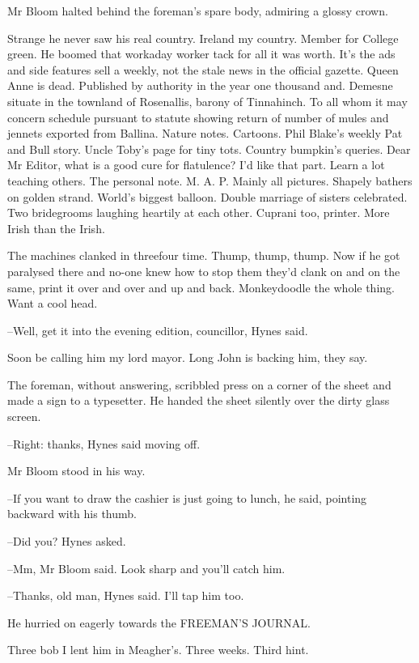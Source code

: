 Mr Bloom halted behind the foreman's spare body, admiring a glossy crown.

Strange he never saw his real country. Ireland my country. Member
for College green. He boomed that workaday worker tack for all it was
worth. It's the ads and side features sell a weekly, not the stale news in
the official gazette. Queen Anne is dead. Published by authority in the
year one thousand and. Demesne situate in the townland of Rosenallis,
barony of Tinnahinch. To all whom it may concern schedule pursuant to
statute showing return of number of mules and jennets exported from
Ballina. Nature notes. Cartoons. Phil Blake's weekly Pat and Bull story.
Uncle Toby's page for tiny tots. Country bumpkin's queries. Dear Mr
Editor, what is a good cure for flatulence? I'd like that part. Learn a
lot teaching others. The personal note. M. A. P. Mainly all pictures.
Shapely bathers on golden strand. World's biggest balloon. Double marriage
of sisters celebrated. Two bridegrooms laughing heartily at each other.
Cuprani too, printer. More Irish than the Irish.

The machines clanked in threefour time. Thump, thump, thump.
Now if he got paralysed there and no-one knew how to stop them they'd
clank on and on the same, print it over and over and up and back.
Monkeydoodle the whole thing. Want a cool head.

--Well, get it into the evening edition, councillor, Hynes said.

Soon be calling him my lord mayor. Long John is backing him, they say.

The foreman, without answering, scribbled press on a corner of the
sheet and made a sign to a typesetter. He handed the sheet silently over
the dirty glass screen.

--Right: thanks, Hynes said moving off.

Mr Bloom stood in his way.

--If you want to draw the cashier is just going to lunch, he said,
pointing backward with his thumb.

--Did you? Hynes asked.

--Mm, Mr Bloom said. Look sharp and you'll catch him.

--Thanks, old man, Hynes said. I'll tap him too.

He hurried on eagerly towards the FREEMAN'S JOURNAL.

Three bob I lent him in Meagher's. Three weeks. Third hint.



